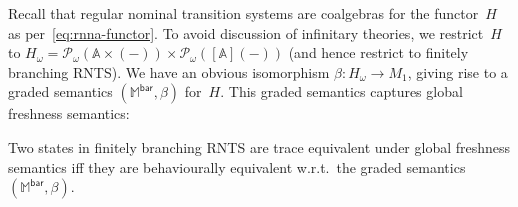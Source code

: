 \documentclass[a4paper,UKenglish,cleveref,thm-restate,numberwithinsect,final]{lipics-v2021}
\newcommand{\Br}{\mathsf{bar}}
\newcommand{\abs}{\mathsf{abs}}
\newcommand{\Names}{\mathbb{A}}
\newcommand{\pow}{\mathcal{P}}
\newcommand{\powf}{\pow_{\omega}}
\newcommand{\bind}[1]{\langle #1\rangle}
\theoremstyle{plain}
\newcommand{\midmid}{\hspace{0.2ex}{\rule[-0.1ex]{0.6pt}{1.65ex}}\hspace{0.2ex}}
\newcommand{\newletter}[1]{{\midmid}#1}
\numberwithin{equation}{section}
\newcommand{\monad}{{\mathbb{M}}}
\newcommand{\+}[1]{\mathcal{#1}\xspace}
\theoremstyle{definition}
\begin{document}
Recall that regular nominal transition systems are coalgebras for the
functor~$H$ as per~\eqref{eq:rnna-functor}. To avoid discussion of
infinitary theories, we restrict~$H$ to
$H_\omega=\powf(\Names\times(-))\times\powf([\Names](-))$ (and hence
restrict to finitely branching RNTS). We
have an obvious isomorphism $\beta\colon H_\omega\to M_1$, giving
rise to a graded semantics $(\monad^\Br,\beta)$ for~$H$. This graded
semantics captures global freshness semantics:
\begin{theorem}\label{thm:global-freshness}
  Two states in finitely branching RNTS are trace equivalent under
  global freshness semantics iff they are behaviourally equivalent
  w.r.t.~the graded semantics $(\monad^\Br,\beta)$.
\end{theorem}
\end{document}
